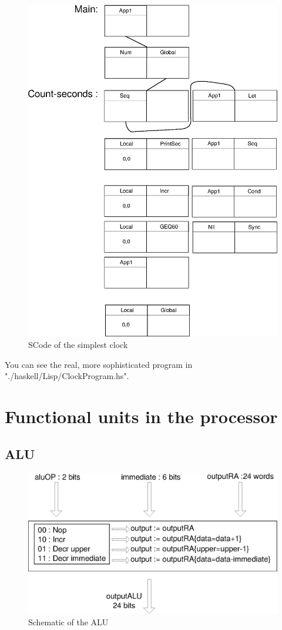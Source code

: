 \documentclass[a4paper, 11pt]{article}
\begin{document}
\begin{figure}[h]
\center
\caption{SCode of the simplest clock}
   \includegraphics[scale=0.5]{clock.eps}
\end{figure}

You can see the real, more sophisticated program in "./haskell/Lisp/ClockProgram.hs".

\newpage
\section{Functional units in the processor}

\subsection{ALU}
\begin{figure}[h]
\center
\caption{Schematic of the ALU}
   \includegraphics[scale=0.5]{ALU.eps}
\end{figure}
\end{document}
